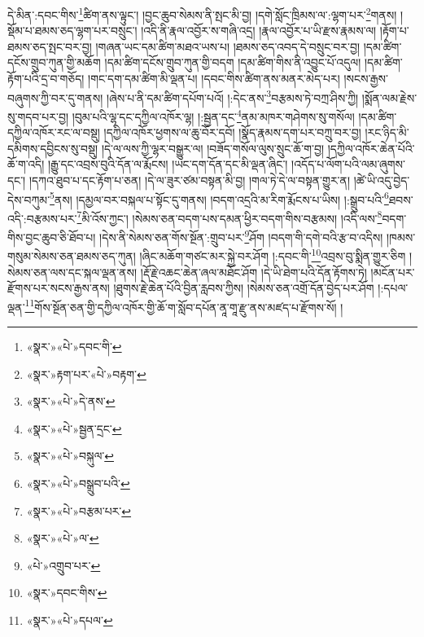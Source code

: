 དེ་མིན་:དབང་གིས་\footnote{«སྣར་»«པེ་»དབང་གི་}ཚིག་ནས་ལྟུང་། །བྱང་ཆུབ་སེམས་ནི་སྤང་མི་བྱ། །དགེ་སློང་ཁྲིམས་ལ་:ལྷག་པར་\footnote{«སྣར་»རྟག་པར་«པེ་»བརྟག་}གནས། །སྡོམ་པ་ཐམས་ཅད་ལྷག་པར་བསྲུང་། །འདི་ནི་རྣལ་འབྱོར་ས་གཞི་འདྲ། །རྣལ་འབྱོར་པ་ཡི་རྫས་རྣམས་ལ། །རྟོག་པ་ཐམས་ཅད་སྤང་བར་བྱ། །གཞན་ཡང་དམ་ཚིག་མཐའ་ཡས་པ། །ཐམས་ཅད་འབད་དེ་བསྲུང་བར་བྱ། །དམ་ཚིག་དངོས་གྲུབ་ཀུན་གྱི་མཆོག །དམ་ཚིག་དངོས་གྲུབ་ཀུན་གྱི་བདག །དམ་ཚིག་གིས་ནི་འབྱུང་པོ་འདུལ། །དམ་ཚིག་རྟོག་པའི་དྲ་བ་གཅོད། །གང་དག་དམ་ཚིག་མི་ལྡན་པ། །དབང་གིས་ཚིག་ནས་མནར་མེད་པར། །སངས་རྒྱས་བཞུགས་ཀྱི་བར་དུ་གནས། །ཞེས་པ་ནི་དམ་ཚིག་དཔོག་པའོ། །:དེང་ནས་\footnote{«སྣར་»«པེ་»དེ་ནས་}བརྩམས་ཏེ་བཀྲ་ཤིས་ཀྱི། །སྨོན་ལམ་རྗེས་སུ་གདབ་པར་བྱ། །བུམ་པའི་ལྷ་དང་དཀྱིལ་འཁོར་ལྷ། །:སྦྱན་དང་\footnote{«སྣར་»«པེ་»སྦྱན་དྲང་}ནམ་མཁར་གཤེགས་སུ་གསོལ། །དམ་ཚིག་དཀྱིལ་འཁོར་རང་ལ་བསྡུ། །དཀྱིལ་འཁོར་ཕྱགས་ལ་ཆུ་བོར་དབོ། །སྣོད་རྣམས་དག་པར་བཀྲུ་བར་བྱ། །རང་ཉིད་མི་དམིགས་དབྱིངས་སུ་བསྡུ། །དེ་ལ་ལས་ཀྱི་ལྷར་བསྒྱུར་ལ། །བཟོད་གསོལ་ལུས་སྲུང་ཆོ་ག་བྱ། །དཀྱིལ་འཁོར་ཆེན་པོའི་ཆོ་ག་འདི། །རྒྱུ་དང་འབྲས་བུའི་དོན་ལ་རྨོངས། །ཡང་དག་དོན་དང་མི་ལྡན་ཞིང་། །འདོད་པ་ལོག་པའི་ལམ་ཞུགས་དང་། །དཀའ་ཐུབ་པ་དང་རྟོག་པ་ཅན། །དེ་ལ་ཟུར་ཙམ་བསྟན་མི་བྱ། །གལ་ཏེ་དེ་ལ་བསྟན་གྱུར་ན། །ཚེ་ཡི་འདུ་བྱེད་དེས་བཀུམ་\footnote{«སྣར་»«པེ་»བསྐུལ་}ནས། །དམྱལ་བར་བསྐལ་པ་སྟོང་དུ་གནས། །བདག་འདྲའི་མ་རིག་རྨོངས་པ་ཡིས། །:སྒྲུབ་པའི་\footnote{«སྣར་»«པེ་»བསྒྲུབ་པའི་}ཐབས་འདི་:བརྩམས་པར་\footnote{«སྣར་»«པེ་»བརྩམ་པར་}མི་འོས་ཀྱང་། །སེམས་ཅན་བདག་པས་དམན་ཕྱིར་བདག་གིས་བརྩམས། །འདི་ལས་\footnote{«སྣར་»«པེ་»ལ་}བདག་གིས་བྱང་ཆུབ་ཅི་ཐོབ་པ། །དེས་ནི་སེམས་ཅན་གོས་སྔོན་:གྲུབ་པར་\footnote{«པེ་»འགྲུབ་པར་}ཤོག །བདག་གི་དགེ་བའི་རྩ་བ་འདིས། །ཁམས་གསུམ་སེམས་ཅན་ཐམས་ཅད་ཀུན། །ཞིང་མཆོག་གཙང་མར་སྐྱེ་བར་ཤོག །:དབང་གི་\footnote{«སྣར་»དབང་གིས་}འབྲས་བུ་སྨིན་གྱུར་ཅིག །སེམས་ཅན་ལས་དང་སྐལ་ལྡན་ནས། །རྡོ་རྗེ་འཆང་ཆེན་ཞལ་མཐོང་ཤོག །དེ་ཡི་ཐེག་པའི་དོན་རྟོགས་ཏེ། །མངོན་པར་རྫོགས་པར་སངས་རྒྱས་ནས། །ཐུགས་རྗེ་ཆེན་པོའི་བྱིན་རླབས་ཀྱིས། །སེམས་ཅན་འགྲོ་དོན་བྱེད་པར་ཤོག །:དཔལ་ལྡན་\footnote{«སྣར་»«པེ་»དཔལ་}གོས་སྔོན་ཅན་གྱི་དཀྱིལ་འཁོར་གྱི་ཆོ་ག་སློབ་དཔོན་ནཱ་གཱ་རྫུ་ནས་མཛད་པ་རྫོགས་སོ། ། 